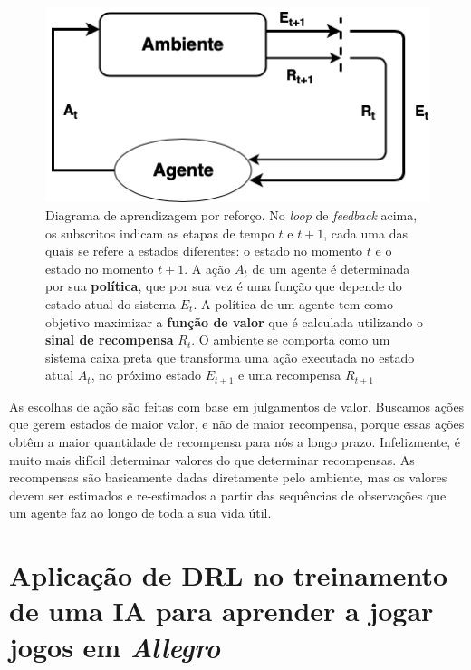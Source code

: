  \begin{figure}[h]
  \centering
  \includegraphics[width=.6 \textwidth]{conteudo/imgs/rl-diagram.png}
  \caption[Diagrama de aprendizagem por reforço]{Diagrama de aprendizagem por reforço. No \textit{loop} de \textit{feedback} acima, os subscritos indicam as etapas de tempo $t$ e $t + 1$, cada uma das quais se refere a estados diferentes: o estado no momento $t$ e o estado no momento $t + 1$. 
  A ação $A_t$ de um agente é determinada por sua \textbf{política}, que por sua vez é uma função que depende do estado atual do sistema $E_t$. A política de um agente tem como objetivo maximizar a \textbf{função de valor} que é calculada utilizando o \textbf{sinal de recompensa} $R_t$. O ambiente se comporta como um sistema caixa preta que transforma uma ação executada no estado atual $A_t$, no próximo estado $E_{t+1}$ e uma recompensa $R_{t+1}$
  }
  \label{rl-diagram}
 \end{figure}

 As escolhas de ação são feitas com base em julgamentos de valor.
 Buscamos ações que gerem estados de maior valor, e não de maior recompensa, porque essas ações obtêm a maior quantidade de recompensa para nós a longo prazo. 
 Infelizmente, é muito mais difícil determinar valores do que determinar recompensas. As recompensas são basicamente dadas diretamente pelo ambiente, mas os valores devem ser estimados e re-estimados a partir das sequências de observações que um agente faz ao longo de toda a sua vida útil.


\section{Aplicação de DRL no treinamento de uma IA para aprender a jogar jogos em \textit{Allegro}} %
 \label{sec:aplicação_de_drl_no_treinamento_de_uma_ia_para_aprender_a_jogar_jogos_em_allegro}

